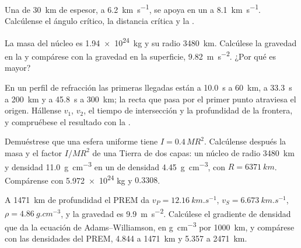 \begin{exercise}[$\star$]\label{exo:b1:layered-earth:3}
Una  de \qty{30}{km} de espesor, a \qty{6.2}{km.s^{-1}}, se apoya en un  a \qty{8.1}{km.s^{-1}}. Calcúlense el
ángulo crítico, la distancia crítica y la .
\end{exercise}

\begin{exercise}[$\star$]\label{exo:b1:layered-earth:4}
La masa del núcleo es \qty{1.94e24}{kg} y su radio \qty{3480}{km}. Calcúlese la gravedad en la  y
compárese con la gravedad en la superficie, \qty{9.82}{m.s^{-2}}. ¿Por qué es mayor?
\end{exercise}

\begin{exercise}[$\star\star$]\label{exo:b1:layered-earth:5}
En un perfil de refracción las primeras llegadas están a \qty{10.0}{s} a \qty{60}{km}, a \qty{33.3}{s} a \qty{200}{km} y a
\qty{45.8}{s} a \qty{300}{km}; la recta que pasa por el primer punto atraviesa el origen. Hállense $v_1$, $v_2$, el tiempo de
intersección y la profundidad de la frontera, y compruébese el resultado con la .
\end{exercise}

\begin{exercise}[$\star\star$]\label{exo:b1:layered-earth:6}
Demuéstrese que una esfera uniforme tiene $I = 0.4\,MR^2$. Calcúlense después la masa y el factor $I/MR^2$ de una Tierra de dos
capas: un núcleo de radio \qty{3480}{km} y densidad \qty{11.0}{g.cm^{-3}} en un  de densidad \qty{4.45}{g.cm^{-3}}, con
$R = \qty{6371}{km}$. Compárense con \num{5.972e24} kg y $0.3308$.
\end{exercise}

\begin{exercise}[$\star\star$]\label{exo:b1:layered-earth:7}
A \qty{1471}{km} de profundidad el PREM da $v_P = \qty{12.16}{km.s^{-1}}$, $v_S = \qty{6.673}{km.s^{-1}}$, $\rho = \qty{4.86}{g.cm^{-3}}$,
y la gravedad es \qty{9.9}{m.s^{-2}}. Calcúlese el gradiente de densidad que da la ecuación de Adams--Williamson, en
\unit{g.cm^{-3}} por \qty{1000}{km}, y compárese con las densidades del PREM, \num{4.844} a \qty{1471}{km} y \num{5.357} a
\qty{2471}{km}.
\end{exercise}

